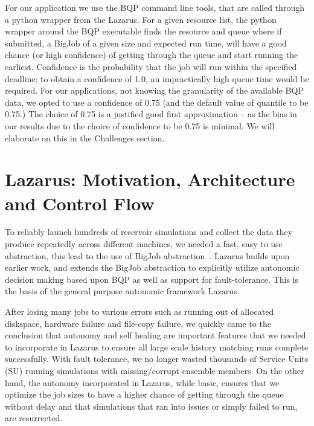 \documentclass{sig-alternate}
\newcommand{\jhanote}[1]{ {\textcolor{red} { ***Jha: #1 }}}
\newcommand{\yyenote}[1]{ {\textcolor{blue} { ***yye00: #1 }}}
\newcommand{\jhanote}[1]{}
\newcommand{\yyenote}[1]{}
\begin{document}
For our application we use the BQP command line tools, that are called
through a python wrapper from the Lazarus.  For a given resource list,
the python wrapper around the BQP executable finds the resource and
queue where if submitted, a BigJob of a given size and expected run
time, will have a good chance (or high confidence) of getting through
the queue and start running the earliest. Confidence is the
probability that the job will run within the specified deadline; to
obtain a confidence of 1.0, an impractically high queue time would be
required. For our applications, not knowing the granularity of the
available BQP data, we opted to use a confidence of 0.75 (and the
default value of quantile to be 0.75.)  The choice of 0.75 is a
justified good first approximation -- as the bias in our results due
to the choice of confidence to be 0.75 is minimal. We will elaborate
on this in the Challenges section.



\section{Lazarus: Motivation, Architecture and Control Flow}


To reliably launch hundreds of reservoir simulations and collect the
data they produce repeatedly across different machines, we needed a
fast, easy to use abstraction, this lead to the use of BigJob
abstraction~\cite{saga_royalsoc}.  Lazarus builds upon earlier work,
and extends the BigJob abstraction to explicitly utilize autonomic
decision making based upon BQP as well as support for
fault-tolerance. This is the basis of the general purpose autonomic
framework Lazarus.

After losing many jobs to various errors such as running out of allocated diskspace, hardware failure and file-copy failure, we quickly came to the conclusion that autonomy and self healing are important features that we needed to incorporate in Lazarus to ensure all large scale history matching runs complete successfully. With fault tolerance, we no longer wasted thousands of Service Units (SU) running simulations with missing/corrupt ensemble members.  On the other hand, the autonomy incorporated in Lazarus, while basic, ensures that we optimize the job sizes to have a higher chance of getting through the queue without delay and that simulations that ran into issues or simply failed to run, are resurrected.
\end{document}
